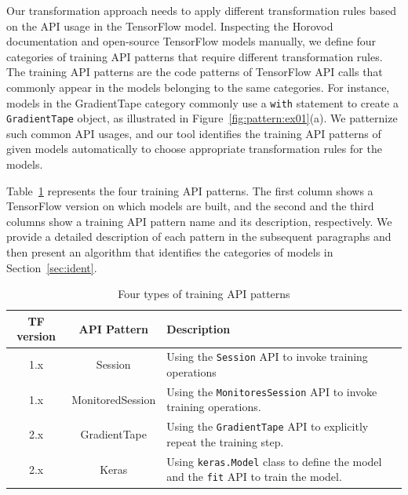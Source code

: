 Our transformation approach needs to apply different transformation rules based
on the API usage in the TensorFlow model. 
Inspecting the Horovod documentation and open-source TensorFlow models
manually, we define four categories of training API patterns that require
different transformation rules. 
The training API patterns are the code patterns of TensorFlow API calls that
commonly appear in the models belonging to the same categories.
For instance, models in the {GradientTape} category commonly use a {\tt with}
statement to create a {\tt GradientTape} object, as illustrated in
Figure~\ref{fig:pattern:ex01}(a).
We patternize such common API usages, and our tool identifies the training API
patterns of given models automatically to choose appropriate transformation
rules for the models.

Table~\ref{tab:patterns} represents the four training API patterns. 
The first column shows a TensorFlow version on which models are built, and the
second and the third columns show a training API pattern name and its
description, respectively.
We provide a detailed description of each pattern in the subsequent paragraphs
and then present an algorithm that identifies the categories of models in
Section~\ref{sec:ident}.


\begin{table}[ht!]
  \centering
  \caption{Four types of training API patterns}
  \begin{tabular}{|c|c|l|}
    \hline
    TF version & API Pattern & Description \\
    \hline
    1.x & Session & 
	  Using the {\tt Session} API to invoke training operations\\
    \hline
    1.x & MonitoredSession & 
      Using the {\tt MonitoresSession} API to invoke training operations.\\
    \hline
    2.x & GradientTape & 
      Using the {\tt GradientTape} API to explicitly repeat the training
      step.\\
    \hline
    2.x & Keras & 
      Using {\tt keras.Model} class to define the model and the {\tt fit} API
      to train the model.\\
    \hline
  \end{tabular}
  \label{tab:patterns}
\end{table}

